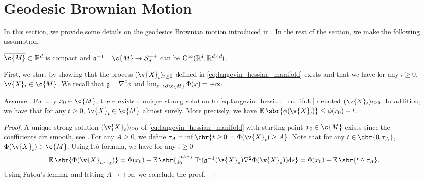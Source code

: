 \section{Geodesic Brownian Motion}
\label{sec:geod-brown-moti}

In this section, we provide some details on the geodesics Brownian motion introduced in .
In the rest of the section, we make the following assumption.

\begin{assumption}
	\label{assum:log_barrier_method}
	$\cl{\c{M}} \subset \R^d$ is compact and
	$\mathfrak{g}^{-1}: \ \c{M} \to \mathcal{S}_d^{++}$ can be
	$\mathrm{C}^\infty(\mathbb{R}^d, \mathbb{R}^{d \times d})$.
\end{assumption}

First, we start by showing that the process $(\v{X}_t)_{t \geq 0}$ defined in \eqref{eq:langevin_hessian_manifold} exists and that we have for any $t \geq 0$, $\v{X}_t \in \c{M}$.
We recall that $\mathfrak{g} = \nabla^2 \phi$ and $\lim_{x \to \partial \c{M}} \Phi(x) = +\infty$.

\begin{proposition}
	Assume \textup{}.
	For any $x_0 \in \c{M}$, there exists a unique strong solution to \eqref{eq:langevin_hessian_manifold} denoted $(\v{X}_t)_{t \geq 0}$.
	In addition, we have that for any $t \geq 0$, $\v{X}_t \in \c{M}$ almost surely.
	More precisely, we have $\E\sbr{\phi(\v{X}_t)} \leq \phi(x_0) + t$.
\end{proposition}

\begin{proof}
	A unique strong solution $(\v{X}_t)_{t \geq 0}$ of \eqref{eq:langevin_hessian_manifold} with starting point $x_0\in \c{M}$ exists since the coefficients are smooth, see \cite[Theorem 3.1, p.165]{ikeda2014stochastic}.
	For any $A \geq 0$, we define $\tau_A = \inf \cbr{t \geq 0 \; : \; \Phi(\v{X}_t) \geq A}$.
	Note that for any $t \in \cbr{0, \tau_A}$, $\Phi(\v{X}_t) \in \c{M}$.
	Using It\^o formula, we have for any $t \geq 0$ \begin{equation} \textstyle \E\sbr{\Phi(\v{X}_{t \wedge \tau_A})} = \Phi(x_0) + \E\sbr{\int_0^{t \wedge \tau_A} \mathrm{Tr}(\mathfrak{g}^{-1}(\v{X}_s) \nabla^2 \Phi(\v{X}_s) )\mathrm{d} s} = \Phi(x_0) + \E\sbr{t \wedge \tau_A} .
	\end{equation}
	Using Fatou's lemma, and letting $A \to +\infty$, we conclude the proof.
\end{proof}

